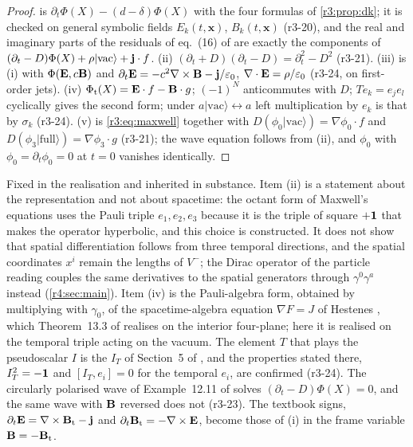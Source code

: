 \begin{proof}
 is $\partial_t\Phi(X)-(d-\delta)\Phi(X)$ with the four formulas of \cref{r3:prop:dk}; it is checked on general symbolic fields
$E_k(t,\mathbf x)$, $B_k(t,\mathbf x)$ (r3-20), and the real and imaginary parts of the residuals of eq.~(16) of \cite{ES17} are exactly the
components of $(\partial_t-D)\Phi(X)+\rho|\mathrm{vac}\rangle+\mathbf j\cdot f$. (ii) $(\partial_t+D)(\partial_t-D)=\partial_t^2-D^2$ (r3-21). (iii) is (i) with $\Phi(\mathbf E,c\mathbf B)$ and
$\partial_t\mathbf E=-c^2\nabla\times\mathbf B-\mathbf j/\varepsilon_0$, $\nabla\cdot\mathbf E=\rho/\varepsilon_0$ (r3-24, on first-order jets). (iv) $\Phi_{\rm t}(X)=\mathbf E\cdot f-\mathbf B\cdot g$; $(-1)^N$
anticommutes with $D$; $Te_k=e_je_l$ cyclically gives the second form; under $a|\mathrm{vac}\rangle\leftrightarrow a$ left multiplication by $e_k$ is that by $\sigma_k$ (r3-24). (v) is
\cref{r3:eq:maxwell} together with $D(\phi_0|\mathrm{vac}\rangle)=\nabla\phi_0\cdot f$ and $D(\phi_3|\mathrm{full}\rangle)=\nabla\phi_3\cdot g$ (r3-21); the wave equation follows from (ii), and
$\phi_0$ with $\phi_0=\partial_t\phi_0=0$ at $t=0$ vanishes identically.
\end{proof}

Fixed in the realisation and inherited in substance. Item (ii) is a statement about the representation and not about spacetime: the
octant form of Maxwell's equations uses the Pauli triple $e_1,e_2,e_3$ because it is the triple of square $+\mathbf 1$ that makes the operator hyperbolic,
and this choice is constructed. It does not show that spatial differentiation follows from three temporal directions, and the spatial
coordinates $x^i$ remain the lengths of $V^-$; the Dirac operator of the particle reading couples the same derivatives to the spatial
generators through $\gamma^0\gamma^a$ instead (\cref{r4:sec:main}). Item (iv) is the Pauli-algebra form, obtained by multiplying with $\gamma_0$, of the
spacetime-algebra equation $\nabla F=J$ of Hestenes \cite{Hestenes66}, which Theorem~13.3 of \cite{ES17} realises on the interior four-plane; here
it is realised on the temporal triple acting on the vacuum. The element $T$ that plays the pseudoscalar $I$ is the $I_T$ of Section~5 of \cite{FMB},
and the properties stated there, $I_T^2=-\mathbf 1$ and $[I_T,e_i]=0$ for the temporal $e_i$, are confirmed (r3-24). The circularly polarised wave of Example~12.11 of \cite{ES17} solves $(\partial_t-D)\Phi(X)=0$, and the same wave with $\mathbf B$ reversed does
not (r3-23). The textbook signs, $\partial_t\mathbf E=\nabla\times\mathbf B_{\rm t}-\mathbf j$ and $\partial_t\mathbf B_{\rm t}=-\nabla\times\mathbf E$, become those of (i) in the frame
variable $\mathbf B=-\mathbf B_{\rm t}$.

